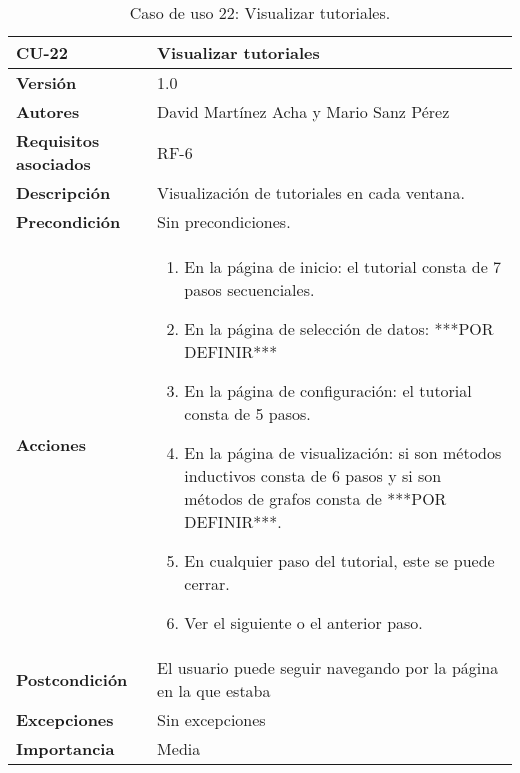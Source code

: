 \begin{table}[p]
	\centering
	\begin{tabularx}{\linewidth}{ p{} p{} }
		\toprule
		\textbf{CU-22}    & \textbf{Visualizar tutoriales}\\
		\toprule
		\textbf{Versión}              & 1.0    \\
		\textbf{Autores}                & David Martínez Acha y Mario Sanz Pérez\\
		\textbf{Requisitos asociados} & RF-6 \\
		\textbf{Descripción}          & Visualización de tutoriales en cada ventana. \\
		\textbf{Precondición}         & Sin precondiciones. \\
		\textbf{Acciones}             &
		\begin{enumerate}
			\def\labelenumi{\arabic{enumi}.}
			\tightlist
			\item En la página de inicio: el tutorial consta de 7 pasos secuenciales.
			\item En la página de selección de datos: ***POR DEFINIR***
			\item En la página de configuración: el tutorial consta de 5 pasos.
			\item En la página de visualización: si son métodos inductivos consta de 6 pasos y si son métodos de grafos consta de ***POR DEFINIR***.
			\item En cualquier paso del tutorial, este se puede cerrar.
			\item Ver el siguiente o el anterior paso.
		\end{enumerate}\\
		\textbf{Postcondición}        & El usuario puede seguir navegando por la página en la que estaba \\
		\textbf{Excepciones}          & Sin excepciones \\
		\textbf{Importancia}          & Media \\
		\bottomrule
	\end{tabularx}
	\caption{Caso de uso 22: Visualizar tutoriales.}
\end{table}